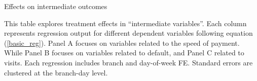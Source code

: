 \documentclass[11pt, a4paper]{article}
\begin{document}
\begin{landscape}
    

\begin{table}
\caption{Effects on intermediate outcomes}
\label{mechanisms}
\begin{center}

\scriptsize{}

\end{center}
\scriptsize{This table explores treatment effects in ``intermediate variables''. Each column represents regression output for different dependent variables following equation (\ref{basic_reg}). Panel A focuses on variables related to the speed of payment. While Panel B focuses on variables related to default, and Panel C related to visits. 
Each regression includes branch and day-of-week FE. Standard errors are clustered at the branch-day level.}
\end{table}
\end{landscape}
\end{document}
